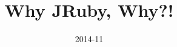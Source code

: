 \usepackage{etex}
\usepackage[english]{babel}

\usepackage[all]{xy}
\usepackage[latin1]{inputenc}

\usepackage{palatino,courier}
\usepackage{amsfonts,amssymb}
\usepackage[mathscr]{euscript}
\usepackage{stmaryrd}
\usepackage{eulervm}

\usepackage{proof}
\usepackage{amsmath}
\usepackage{xspace}

\usepackage{graphicx}
\usepackage{listings}
\usepackage{color}

\lstset{language=Ruby}
%
%
%




\title{Why JRuby, Why?!}

\author[Brett~Giles]{}



\date
{2014-11}

\subject{JRuby}




